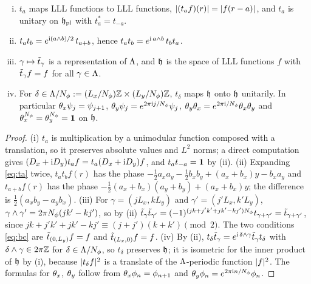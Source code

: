 \begin{lemma}\label{lem:magtrans}
\begin{enumerate}[(i)]
\item $t_a$ maps LLL functions to LLL functions, $\lvert(t_af)(r)\rvert=\lvert f(r-a)\rvert$, and $t_a$ is unitary on $\mathfrak{h}_{\mathrm{pl}}$
with $t_a^*=t_{-a}$.
\item $t_at_b=e^{\mathrm{i}(a\wedge b)/2}\,t_{a+b}$, hence $t_at_b=e^{\mathrm{i}\,a\wedge b}\,t_bt_a$.
\item $\gamma\mapsto\tilde t_\gamma$ is a representation of $\Lambda$, and $\mathfrak{h}$ is the space of LLL functions $f$ with
$\tilde t_\gamma f=f$ for all $\gamma\in\Lambda$.
\item For $\delta\in\Lambda/N_{\phi}:=(L_x/N_{\phi})\mathbb{Z}\times(L_y/N_{\phi})\mathbb{Z}$, $t_\delta$ maps $\mathfrak{h}$ onto $\mathfrak{h}$ unitarily. In particular
$\theta_x\psi_j=\psi_{j+1}$, $\theta_y\psi_j=e^{2\pi\mathrm{i} j/N_{\phi}}\psi_j$, $\theta_y\theta_x=e^{2\pi\mathrm{i}/N_{\phi}}\theta_x\theta_y$ and
$\theta_x^{N_{\phi}}=\theta_y^{N_{\phi}}=\mathbf{1}$ on $\mathfrak{h}$.
\end{enumerate}
\end{lemma}

\begin{proof}
(i) $t_a$ is multiplication by a unimodular function composed with a translation, so it preserves absolute values
and $L^2$ norms; a direct computation gives $(D_x+\mathrm{i} D_y)t_af=t_a(D_x+\mathrm{i} D_y)f$, and $t_at_{-a}=\mathbf{1}$ by (ii).
(ii) Expanding \eqref{eq:ta} twice, $t_at_bf(r)$ has the phase
$-\tfrac12a_xa_y-\tfrac12b_xb_y+(a_x+b_x)y-b_xa_y$ and $t_{a+b}f(r)$ has the phase
$-\tfrac12(a_x+b_x)(a_y+b_y)+(a_x+b_x)y$; the difference is $\tfrac12(a_xb_y-a_yb_x)$. (iii) For $\gamma=(jL_x,kL_y)$
and $\gamma'=(j'L_x,k'L_y)$, $\gamma\wedge\gamma'=2\pi N_{\phi}(jk'-kj')$, so by (ii)
$\tilde t_\gamma\tilde t_{\gamma'}=(-1)^{(jk+j'k'+jk'-kj')N_{\phi}}t_{\gamma+\gamma'}=\tilde t_{\gamma+\gamma'}$, since
$jk+j'k'+jk'-kj'\equiv(j+j')(k+k')\pmod 2$. The two conditions \eqref{eq:bc} are $\tilde t_{(0,L_y)}f=f$ and
$\tilde t_{(L_x,0)}f=f$. (iv) By (ii), $t_\delta\tilde t_\gamma=e^{\mathrm{i}\,\delta\wedge\gamma}\tilde t_\gamma t_\delta$ with
$\delta\wedge\gamma\in2\pi\mathbb{Z}$ for $\delta\in\Lambda/N_{\phi}$, so $t_\delta$ preserves $\mathfrak{h}$; it is isometric for the inner
product of $\mathfrak{h}$ by (i), because $\lvert t_\delta f\rvert^2$ is a translate of the $\Lambda$-periodic function $\lvert f\rvert^2$. The
formulas for $\theta_x$, $\theta_y$ follow from $\theta_x\phi_n=\phi_{n+1}$ and $\theta_y\phi_n=e^{2\pi\mathrm{i} n/N_{\phi}}\phi_n$.
\end{proof}

